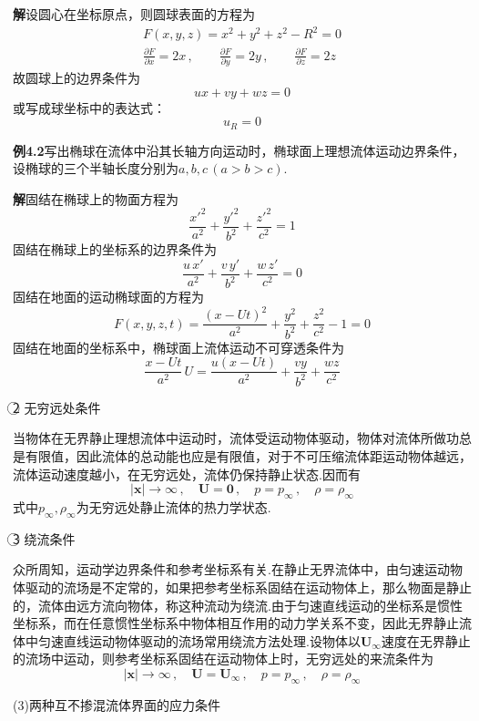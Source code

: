 \noindent\textbf{解}\quad 设圆心在坐标原点，则圆球表面的方程为
\begin{gather*}
F(x,y,z)=x^{2}+y^{2}+z^{2}-R^{2}=0\\[2pt]
\frac{\partial F}{\partial x}=2x\,,\qquad \frac{\partial F}{\partial y}=2y\,,\qquad \frac{\partial F}{\partial z}=2z
\end{gather*}
故圆球上的边界条件为
\[
ux+vy+wz=0
\]
或写成球坐标中的表达式：
\[
u_R=0
\]

\noindent\textbf{例4.2}\quad 写出椭球在流体中沿其长轴方向运动时，椭球面上理想流体运动边界条件，设椭球的三个半轴长度分别为$a,b,c\,(a>b>c)$.

\noindent\textbf{解}\quad 固结在椭球上的物面方程为
\[
\frac{x'^{2}}{a^{2}}+\frac{y'^{2}}{b^{2}}+\frac{z'^{2}}{c^{2}}=1
\]
固结在椭球上的坐标系的边界条件为
\[
\frac{u\,x'}{a^{2}}+\frac{v\,y'}{b^{2}}+\frac{w\,z'}{c^{2}}=0
\]
固结在地面的运动椭球面的方程为
\[
F(x,y,z,t)=\frac{(x-Ut)^{2}}{a^{2}}+\frac{y^{2}}{b^{2}}+\frac{z^{2}}{c^{2}}-1=0
\]
固结在地面的坐标系中，椭球面上流体运动不可穿透条件为
\[
\frac{x-Ut}{a^{2}}\,U=\frac{u(x-Ut)}{a^{2}}+\frac{vy}{b^{2}}+\frac{wz}{c^{2}}
\]

\textcircled{2} 无穷远处条件

当物体在无界静止理想流体中运动时，流体受运动物体驱动，物体对流体所做功总是有限值，因此流体的总动能也应是有限值，对于不可压缩流体距运动物体越远，流体运动速度越小，在无穷远处，流体仍保持静止状态.因而有
\begin{equation*}
|\boldsymbol{x}|\to\infty\,,\quad \boldsymbol{U}=\boldsymbol{0}\,,\quad p=p_\infty\,,\quad \rho=\rho_\infty
\tag{4.17}
\end{equation*}
式中$p_\infty,\rho_\infty$为无穷远处静止流体的热力学状态.

\textcircled{3} 绕流条件

众所周知，运动学边界条件和参考坐标系有关.在静止无界流体中，由匀速运动物体驱动的流场是不定常的，如果把参考坐标系固结在运动物体上，那么物面是静止的，流体由远方流向物体，称这种流动为绕流.由于匀速直线运动的坐标系是惯性坐标系，而在任意惯性坐标系中物体相互作用的动力学关系不变，因此无界静止流体中匀速直线运动物体驱动的流场常用绕流方法处理.设物体以$\boldsymbol{U}_\infty$速度在无界静止的流场中运动，则参考坐标系固结在运动物体上时，无穷远处的来流条件为
\begin{equation*}
|\boldsymbol{x}|\to\infty\,,\quad \boldsymbol{U}=\boldsymbol{U}_\infty\,,\quad p=p_\infty\,,\quad \rho=\rho_\infty
\tag{4.18}
\end{equation*}

(3)两种互不掺混流体界面的应力条件

